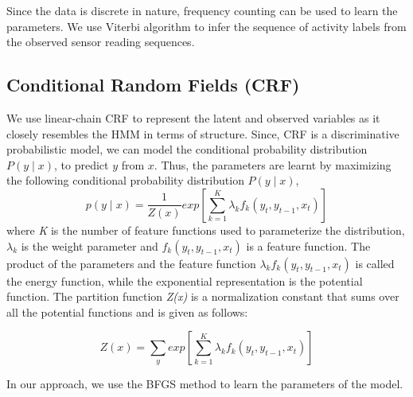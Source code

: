 \documentclass[11pt, oneside]{article}   	%
\begin{document}
Since the data is discrete in nature, frequency counting can be used to learn the parameters. We use Viterbi algorithm to infer the sequence of activity labels from the observed sensor reading sequences. 

\subsection{Conditional Random Fields (CRF)}
We use linear-chain CRF to represent the latent and observed variables as it closely resembles the HMM in terms of structure. Since, CRF is a discriminative probabilistic model, we can model the conditional probability distribution $P(y \mid x)$, to predict $y$ from $x$. Thus, the parameters are learnt by maximizing the following  conditional probability distribution $P(y \mid x)$,
\begin{equation}
p(y\mid x)=\frac{1}{Z(x)}exp\left[{\sum_{k=1}^{K}}{\lambda}_{k}{f}_{k}({y}_{t},{y}_{t-1},{x}_{t})\right]
\end{equation}
where \textit{K} is the number of feature functions used to parameterize the distribution, ${\lambda}_{k}$ is the weight parameter and ${f}_{k}({y}_{t},{y}_{t-1},{x}_{t})$ is a feature function. 
The product of the parameters and the feature function ${\lambda}_{k}{f}_{k}({y}_{t},{y}_{t-1},{x}_{t})$ is called the energy function, while the exponential representation is the potential function. The partition function \textit{Z(x)} is a normalization constant that sums over all the potential functions and is given as follows:


\begin{equation}
Z(x)=\sum_{y}^{}exp\left[{\sum_{k=1}^{K}}{\lambda}_{k}{f}_{k}({y}_{t},{y}_{t-1},{x}_{t})\right]
\end{equation}

In our approach, we use the BFGS method to learn the parameters of the model. 
\end{document}
